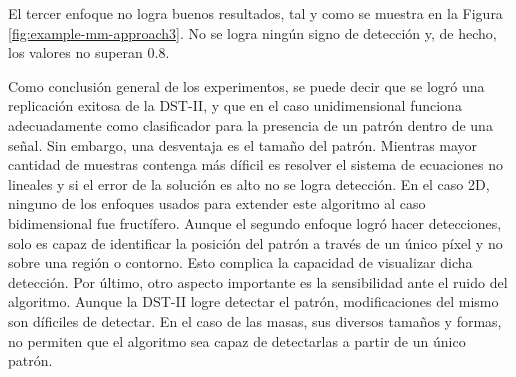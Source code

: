 El tercer enfoque no logra buenos resultados, tal y como se muestra en la Figura \ref{fig:example-mm-approach3}.
No se logra ningún signo de detección y, de hecho, los valores no superan $0.8$. 

Como conclusión general de los experimentos, se puede decir que se logró una replicación exitosa de la DST-II,
y que en el caso unidimensional funciona adecuadamente como clasificador para la presencia de un patrón 
dentro de una señal. Sin embargo, una desventaja es el tamaño del patrón. Mientras mayor cantidad
de muestras contenga más díficil es resolver el sistema de ecuaciones no lineales y si el error de la
solución es alto no se logra detección. 
En el caso 2D, ninguno de los enfoques usados para extender este algoritmo al caso
bidimensional fue fructífero. Aunque el segundo enfoque logró hacer detecciones, solo es capaz
de identificar la posición del patrón a través de un único píxel y no sobre una región o
contorno. Esto complica la capacidad de visualizar
dicha detección. Por último, otro aspecto importante es la sensibilidad ante el ruido del algoritmo. 
Aunque la DST-II logre detectar el patrón, modificaciones del mismo son díficiles de detectar.
En el caso de las masas, sus diversos tamaños y formas, no permiten que el algoritmo sea capaz de detectarlas
a partir de un único patrón.

